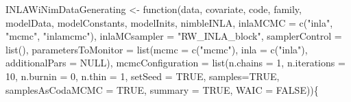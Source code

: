 \documentclass[
]{article}
\newenvironment{Shaded}{\begin{snugshade}}{\end{snugshade}}
\newcommand{\AttributeTok}[1]{\textcolor[rgb]{0.40,0.45,0.13}{#1}}
\newcommand{\ConstantTok}[1]{\textcolor[rgb]{0.56,0.35,0.01}{#1}}
\newcommand{\ControlFlowTok}[1]{\textcolor[rgb]{0.00,0.23,0.31}{#1}}
\newcommand{\DecValTok}[1]{\textcolor[rgb]{0.68,0.00,0.00}{#1}}
\newcommand{\FunctionTok}[1]{\textcolor[rgb]{0.28,0.35,0.67}{#1}}
\newcommand{\NormalTok}[1]{\textcolor[rgb]{0.00,0.23,0.31}{#1}}
\newcommand{\OtherTok}[1]{\textcolor[rgb]{0.00,0.23,0.31}{#1}}
\newcommand{\StringTok}[1]{\textcolor[rgb]{0.13,0.47,0.30}{#1}}
\begin{document}
\begin{Shaded}
\begin{Highlighting}[]
\NormalTok{INLAWiNimDataGenerating }\OtherTok{\textless{}{-}} \ControlFlowTok{function}\NormalTok{(data,}
\NormalTok{                                    covariate,}
\NormalTok{                                    code,}
\NormalTok{                                    family,}
\NormalTok{                                    modelData,}
\NormalTok{                                    modelConstants,}
\NormalTok{                                    modelInits,}
\NormalTok{                                    nimbleINLA,}
                                    \AttributeTok{inlaMCMC =} \FunctionTok{c}\NormalTok{(}\StringTok{"inla"}\NormalTok{, }\StringTok{"mcmc"}\NormalTok{, }\StringTok{"inlamcmc"}\NormalTok{),}
                                    \AttributeTok{inlaMCsampler =} \StringTok{"RW\_INLA\_block"}\NormalTok{,}
                                    \AttributeTok{samplerControl =} \FunctionTok{list}\NormalTok{(),}
                                    \AttributeTok{parametersToMonitor =} \FunctionTok{list}\NormalTok{(}\AttributeTok{mcmc =} \FunctionTok{c}\NormalTok{(}\StringTok{"mcmc"}\NormalTok{),}
                                                               \AttributeTok{inla =} \FunctionTok{c}\NormalTok{(}\StringTok{"inla"}\NormalTok{),}
                                                               \AttributeTok{additionalPars =} \ConstantTok{NULL}\NormalTok{),}
                                    \AttributeTok{mcmcConfiguration =} \FunctionTok{list}\NormalTok{(}\AttributeTok{n.chains =} \DecValTok{1}\NormalTok{,}
                                                             \AttributeTok{n.iterations =} \DecValTok{10}\NormalTok{,}
                                                             \AttributeTok{n.burnin =} \DecValTok{0}\NormalTok{,}
                                                             \AttributeTok{n.thin =} \DecValTok{1}\NormalTok{,}
                                                             \AttributeTok{setSeed =} \ConstantTok{TRUE}\NormalTok{,}
                                                             \AttributeTok{samples=}\ConstantTok{TRUE}\NormalTok{,}
                                                             \AttributeTok{samplesAsCodaMCMC =} \ConstantTok{TRUE}\NormalTok{,}
                                                             \AttributeTok{summary =} \ConstantTok{TRUE}\NormalTok{,}
                                                             \AttributeTok{WAIC =} \ConstantTok{FALSE}\NormalTok{))\{}




\end{Highlighting}
\end{Shaded}
\end{document}
